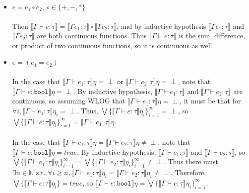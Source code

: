 \documentclass{westhesis}
\begin{document}
 \begin{itemize}
 \item $e = e_1 \circ e_2, \ \circ \in \{+, -, *\}$ \\ \\
 Then $\llbracket \Gamma \vdash e : \tau \rrbracket = \llbracket \Gamma e_1 : \tau \rrbracket \circ \llbracket \Gamma e_2 : \tau 
 \rrbracket$, and by inductive hypothesis $\llbracket \Gamma e_1 : \tau \rrbracket$ and $\llbracket \Gamma e_2 : \tau 
 \rrbracket$ are both continuous functions. Thus $\llbracket \Gamma \vdash e : \tau \rrbracket$ is the sum, difference, or 
 product of two continuous functions, so it is continuous as well. 
  \item $e = (e_1 = e_2)$\\ \\
  In the case that $\llbracket \Gamma \vdash e_1 : \tau \rrbracket\eta = \perp$ or $\llbracket \Gamma \vdash e_2 : \tau 
  \rrbracket\eta = \perp$, note that $\llbracket \Gamma \vdash e : \texttt{bool}\rrbracket\eta = \perp$. By inductive hypothesis, 
  $\llbracket \Gamma \vdash e_1 : \tau \rrbracket$ and $\llbracket \Gamma \vdash e_2 : \tau \rrbracket$ are continuous, so 
  assuming WLOG that $\llbracket \Gamma \vdash e_1 : \tau \rrbracket\eta = \perp$, it must be that for $\forall i, \llbracket 
  \Gamma \vdash e_1 : \tau \rrbracket\eta_i = \perp$. Thus, $\bigvee\{\llbracket \Gamma \vdash e : \tau \rrbracket\eta_i\}
  ^{\infty}_{i=1} = \perp$, so $\bigvee\{\llbracket \Gamma \vdash e : \tau \rrbracket\eta_i\}
  ^{\infty}_{i=1} = \llbracket \Gamma \vdash e_1 : \tau \rrbracket\eta$.\\ \\
  In the case that $\llbracket \Gamma \vdash e_1 : \tau \rrbracket\eta = \llbracket \Gamma \vdash e_2 : \tau \rrbracket\eta \neq 
  \perp$, note that\\ $\llbracket \Gamma \vdash e : \texttt{bool}\rrbracket\eta = true$. By inductive hypothesis, $\llbracket 
  \Gamma \vdash e_1 : \tau \rrbracket$ and $\llbracket \Gamma \vdash e_2 : \tau \rrbracket$, so $\bigvee\{\llbracket \Gamma 
  \vdash e_1 : \tau \rrbracket\eta_i\}^{\infty}_{i=1} = \bigvee\{\llbracket \Gamma \vdash e_2 : \tau \rrbracket\eta_i\}^{\infty}_{i=1} 
  \neq \perp$. Thus there must $\exists n \in \mathbb{N} \text{ s.t. } \forall i \geq n, \llbracket \Gamma \vdash e_1 : \tau \rrbracket\eta_i = 
  \llbracket \Gamma \vdash e_2 : \tau \rrbracket\eta_i \neq \perp$. Therefore, $\bigvee\{\llbracket \Gamma \vdash e : \tau \rrbracket\eta_i\} = true$, so $\llbracket \Gamma \vdash e : \texttt{bool}\rrbracket\eta = \bigvee\{\llbracket \Gamma \vdash e : \tau \rrbracket\eta_i\}^{\infty}_{i=1}$. \\ \\

\end{itemize}
\end{document}
